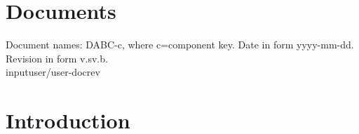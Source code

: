 \documentclass{dabcclass}
\begin{document}
 \cleardoublepage
\thispagestyle{empty} \tableofcontents \thispagestyle{empty} \cleardoublepage
{}

 \cleardoublepage
 \cleardoublepage
 \cleardoublepage

\setcounter{chapter}{0}
\chapter{Documents}
Document names: DABC-c, where c=component key. Date in form yyyy-mm-dd.
Revision in form v.sv.b.\\

%
input{user/user-docrev}

%


%
%
\cleardoublepage
\chapter{Introduction}
 \cleardoublepage
\end{document}
